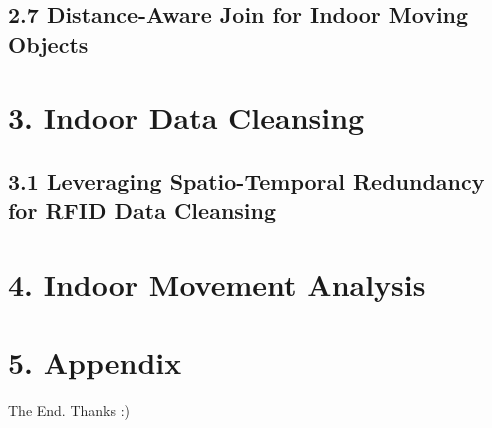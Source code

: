 \documentclass{beamer}
\begin{document}
% 
% 

\subsection{2.7 Distance-Aware Join for Indoor Moving Objects} %

% 
% 

\section{3. Indoor Data Cleansing} %

\subsection{3.1 Leveraging Spatio-Temporal Redundancy for RFID Data Cleansing} %




\section{4. Indoor Movement Analysis} %

\section{5. Appendix} %

%



\begin{frame}
\Huge{\centerline{The End. Thanks :)}}
\end{frame}

\end{document}
